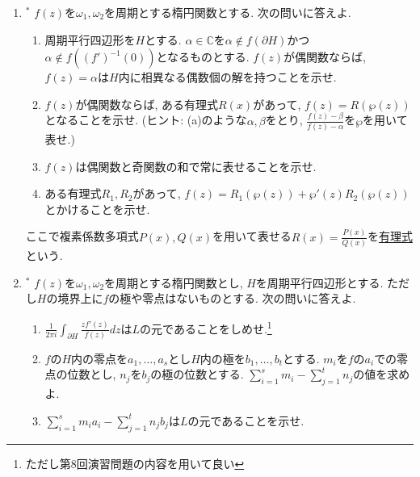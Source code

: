\documentclass[dvipdfmx,a4paper,11pt]{article}
\newcommand{\C}{\mathbb{C}}
\theoremstyle{definition}
\begin{document}
\begin{enumerate}[label=\textbf{問}5.\arabic*]
   
\item$^{*}$  %
$f(z)$を$\omega_1, \omega_2$を周期とする楕円関数とする. 次の問いに答えよ.
\begin{enumerate}
\setlength{\parskip}{0cm} 
  \setlength{\itemsep}{0cm} 
  \item 周期平行四辺形を$H$とする. $\alpha \in \C$を$\alpha \not \in f(\partial H)$かつ$\alpha \not \in f ((f')^{-1}(0))$となるものとする. $f(z)$が偶関数ならば, $f(z)=\alpha$は$H$内に相異なる偶数個の解を持つことを示せ. 
 \item $f(z)$が偶関数ならば, ある有理式$R(x)$があって, $f(z) = R(\wp(z))$となることを示せ. (ヒント: (a)のような$\alpha, \beta$をとり, $\frac{f(z) - \beta}{f(z) - \alpha}$を$\wp$を用いて表せ.)
 \item $f(z)$は偶関数と奇関数の和で常に表せることを示せ.
 \item ある有理式$R_1, R_2$があって, $f(z) = R_1(\wp(z)) + \wp' (z)R_2(\wp(z))$とかけることを示せ.
  \end{enumerate}  
 ここで複素係数多項式$P(x), Q(x)$を用いて表せる$R(x) = \frac{P(x)}{Q(x)}$を\underline{有理式}という.
      
\item \label{divisor}$^{*}$ %
$f(z)$を$\omega_1, \omega_2$を周期とする楕円関数とし, $H$を周期平行四辺形とする. ただし$H$の境界上に$f$の極や零点はないものとする. 次の問いに答えよ. 
\begin{enumerate}
\setlength{\parskip}{0cm} 
  \setlength{\itemsep}{0cm} 
  \item $\frac{1}{2 \pi i} \int_{\partial H} \frac{z f'(z)}{f(z)} dz$は$L$の元であることをしめせ.\footnote{ただし第8回演習問題の内容を用いて良い}
  \item $f$の$H$内の零点を$a_1, \ldots, a_s$とし$H$内の極を$b_1, \ldots, b_t$とする. 
  $m_i$を$f$の$a_i$での零点の位数とし, $n_j$を$b_j$の極の位数とする. $\sum_{i=1}^{s}m_i - \sum_{j=1}^{t}n_j$の値を求めよ. 
  \item $\sum_{i=1}^{s}m_ia_i - \sum_{j=1}^{t}n_jb_j $は$L$の元であることを示せ. %

 \end{enumerate}  
  
     
     
     
  
     

\end{enumerate}
\end{document}
